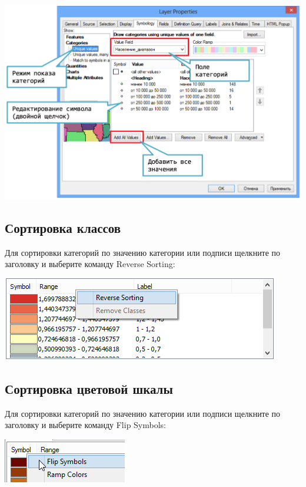 \documentclass[12pt,]{book}
\begin{document}
\includegraphics{images/Appendix/image16.png}

\hypertarget{manual-vector-sorting}{%
\subsection{Сортировка классов}\label{manual-vector-sorting}}

Для сортировки категорий по значению категории или подписи щелкните по заголовку и выберите команду Reverse Sorting:

\includegraphics{images/Appendix/image17.png}

\hypertarget{manual-vector-colorscale}{%
\subsection{Сортировка цветовой шкалы}\label{manual-vector-colorscale}}

Для сортировки категорий по значению категории или подписи щелкните по заголовку и выберите команду Flip Symbols:

\includegraphics{images/Appendix/image18.png}
\end{document}
